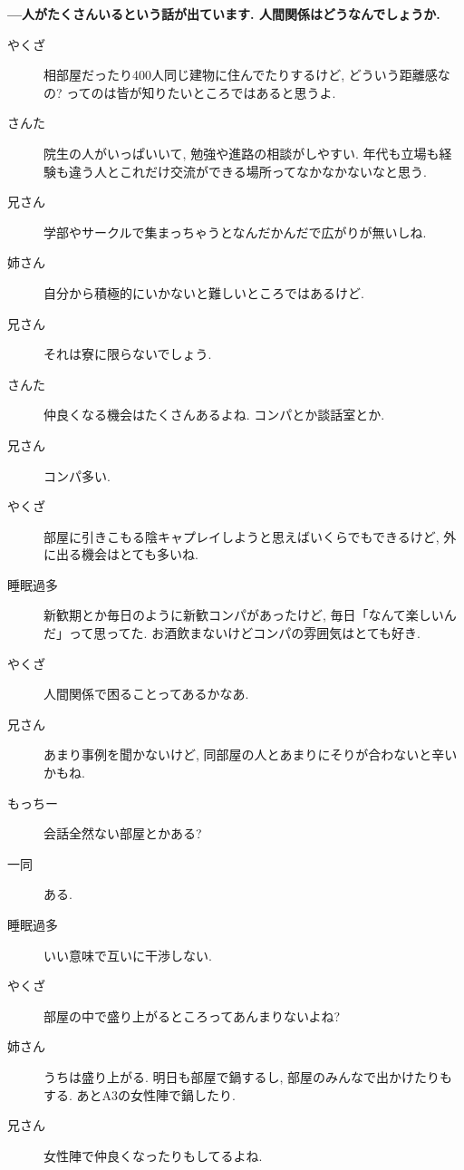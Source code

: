 \documentclass[10pt,b5jsbook,dvips,dvipdfmx,openany]{jsbook}
\theoremstyle{definition}
\begin{document}
\begin{multicols}{2}
		\textbf{---人がたくさんいるという話が出ています. 人間関係はどうなんでしょうか. }
		\begin{description}
		\item[やくざ]相部屋だったり400人同じ建物に住んでたりするけど, どういう距離感なの? ってのは皆が知りたいところではあると思うよ.
		\item[さんた]院生の人がいっぱいいて, 勉強や進路の相談がしやすい. 年代も立場も経験も違う人とこれだけ交流ができる場所ってなかなかないなと思う.
		\item[兄さん]学部やサークルで集まっちゃうとなんだかんだで広がりが無いしね.
		\item[姉さん]自分から積極的にいかないと難しいところではあるけど.
		\item[兄さん]それは寮に限らないでしょう.
		\item[さんた]仲良くなる機会はたくさんあるよね. コンパとか談話室とか.
		\item[兄さん]コンパ多い.
		\item[やくざ]部屋に引きこもる陰キャプレイしようと思えばいくらでもできるけど, 外に出る機会はとても多いね.
		\item[睡眠過多]新歓期とか毎日のように新歓コンパがあったけど, 毎日「なんて楽しいんだ」って思ってた. お酒飲まないけどコンパの雰囲気はとても好き.
		\item[やくざ]人間関係で困ることってあるかなあ.
		\item[兄さん]あまり事例を聞かないけど, 同部屋の人とあまりにそりが合わないと辛いかもね.
		\item[もっちー]会話全然ない部屋とかある?
		\item[ 一同 ]ある.
		\item[睡眠過多]いい意味で互いに干渉しない.
		\item[やくざ]部屋の中で盛り上がるところってあんまりないよね?
		\item[姉さん]うちは盛り上がる. 明日も部屋で鍋するし, 部屋のみんなで出かけたりもする. あとA3の女性陣で鍋したり.
		\item[兄さん]女性陣で仲良くなったりもしてるよね.

\end{description}
\end{multicols}
\end{document}
